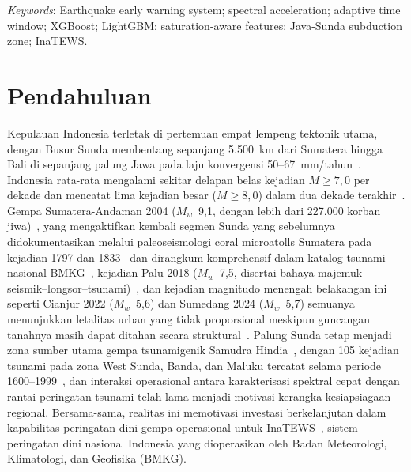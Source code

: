 \documentclass[10pt]{article}
\renewcommand{\cite}[1]{\citep{#1}}
\newcommand{\jetKeywords}[1]{%
  \begin{list}{}{\leftmargin=0.25in \rightmargin=0.25in
                 \topsep=0pt \parsep=0pt}\item[]%
  \fontsize{8}{10}\selectfont\textit{Keywords}: #1
  \end{list}\vspace{1em}}
\begin{document}
\jetKeywords{Earthquake early warning system; spectral acceleration;
adaptive time window; XGBoost; LightGBM; saturation-aware features;
Java-Sunda subduction zone; InaTEWS.}

\section{Pendahuluan}

Kepulauan Indonesia terletak di pertemuan empat lempeng tektonik utama, dengan Busur Sunda membentang sepanjang 5.500~km dari Sumatera hingga Bali di sepanjang palung Jawa pada laju konvergensi 50--67~mm/tahun~\cite{ref2}. Indonesia rata-rata mengalami sekitar delapan belas kejadian $M \geq 7,0$ per dekade dan mencatat lima kejadian besar ($M \geq 8,0$) dalam dua dekade terakhir~\cite{BMKG2026}. Gempa Sumatera-Andaman 2004 ($M_w$~9,1, dengan lebih dari 227.000 korban jiwa)~\cite{ref4, jetSatake2020, NatawidjajaSieh2006, SetiyonoBMKG2019}, yang mengaktifkan kembali segmen Sunda yang sebelumnya didokumentasikan melalui paleoseismologi coral microatolls Sumatera pada kejadian 1797 dan 1833~\cite{NatawidjajaSieh2006} dan dirangkum komprehensif dalam katalog tsunami nasional BMKG~\cite{SetiyonoBMKG2019}, kejadian Palu 2018 ($M_w$~7,5, disertai bahaya majemuk seismik--longsor--tsunami)~\cite{ref6}, dan kejadian magnitudo menengah belakangan ini seperti Cianjur 2022 ($M_w$~5,6) dan Sumedang 2024 ($M_w$~5,7) semuanya menunjukkan letalitas urban yang tidak proporsional meskipun guncangan tanahnya masih dapat ditahan secara struktural~\cite{jetMukhlisin2023}. Palung Sunda tetap menjadi zona sumber utama gempa tsunamigenik Samudra Hindia~\cite{LatiefPuspitoImamura2000, jetSrivastava2008}, dengan 105 kejadian tsunami pada zona West Sunda, Banda, dan Maluku tercatat selama periode 1600--1999~\cite{LatiefPuspitoImamura2000}, dan interaksi operasional antara karakterisasi spektral cepat dengan rantai peringatan tsunami telah lama menjadi motivasi kerangka kesiapsiagaan regional. Bersama-sama, realitas ini memotivasi investasi berkelanjutan dalam kapabilitas peringatan dini gempa operasional untuk InaTEWS~\cite{jetSubekti2022, jetPribadi2023}, sistem peringatan dini nasional Indonesia yang dioperasikan oleh Badan Meteorologi, Klimatologi, dan Geofisika (BMKG).
\end{document}
